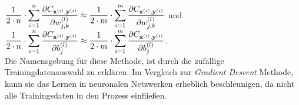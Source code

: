 \\[0.2cm]
$\displaystyle \frac{1}{2\cdot n} \cdot \sum\limits_{i=1}^n \frac{\partial C_{\mathbf{x}^{(i)}, \mathbf{y}^{(i)}}}{\partial w_{j,k}^{(l)}}
 \approx
 \frac{1}{2\cdot m} \cdot \sum\limits_{i=1}^m \frac{\partial C_{\mathbf{x}^{(i)}, \mathbf{y}^{(i)}}}{\partial w_{j,k}^{(l)}}
$
\quad und \quad
$\displaystyle \frac{1}{2\cdot n} \cdot \sum\limits_{i=1}^n \frac{\partial C_{\mathbf{x}^{(i)}, \mathbf{y}^{(i)}}}{\partial b_{j}^{(l)}}
     \approx
     \frac{1}{2\cdot m} \cdot \sum\limits_{i=1}^m \frac{\partial C_{\mathbf{x}^{(i)}, \mathbf{y}^{(i)}}}{\partial b_{j}^{(l)}}
$.
\\[0.2cm]
Die Namensgebung für diese Methode, ist durch die zufällige Trainingdatenauswahl zu erklären. Im Vergleich zur \textit{Gradient Descent} Methode, kann sie das Lernen in neuronalen Netzwerken erheblich beschleunigen, da nicht alle Trainingsdaten in den Prozess einfließen.